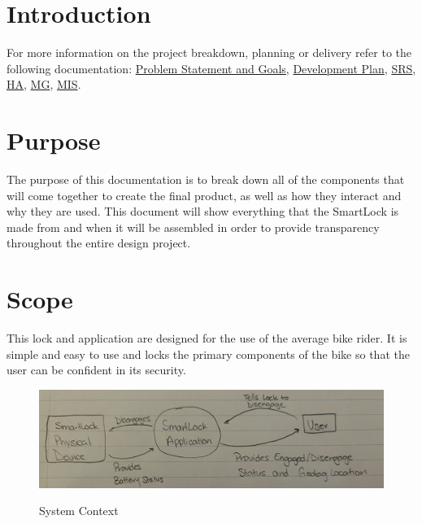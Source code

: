 \documentclass[12pt, titlepage]{article}
\begin{document}
\newpage


\listoffigures

\newpage


\section{Introduction}

For more information on the project breakdown, planning or delivery refer to the following documentation:
 \href{https://github.com/NevoAbigail/Capstone/blob/main/docs/ProblemStatementAndGoals/ProblemStatement.pdf}{Problem Statement and Goals},
 \href{https://github.com/NevoAbigail/Capstone/blob/main/docs/DevelopmentPlan/DevelopmentPlan.pdf}{Development Plan},
 \href{https://github.com/NevoAbigail/Capstone/blob/main/docs/SRS/SRS.pdf}{SRS},
 \href{https://github.com/NevoAbigail/Capstone/blob/main/docs/HazardAnalysis/HazardAnalysis.pdf}{HA},
 \href{https://github.com/NevoAbigail/Capstone/blob/main/docs/Design/SoftArchitecture/MG.pdf}{MG},
 \href{https://github.com/NevoAbigail/Capstone/blob/main/docs/Design/SoftDetailedDes/MIS.pdf}{MIS}.

\section{Purpose}
The purpose of this documentation is to break down all of the components that will come together to create the final product, as well as how they interact and why they are used. This document will show everything that the SmartLock is made from and when it will be assembled in order to provide transparency throughout the entire design project.



\section{Scope}

This lock and application are designed for the use of the average bike rider. It is simple and easy to use and locks the primary components of the bike so that the user can be confident in its security. 

 \begin{figure}[h!]
 \begin{center}
 {
  \includegraphics[width=0.9\linewidth]{System Context.png}
 }
 \caption{\label{System Context} System Context}
 \end{center}
 \end{figure}
\end{document}
